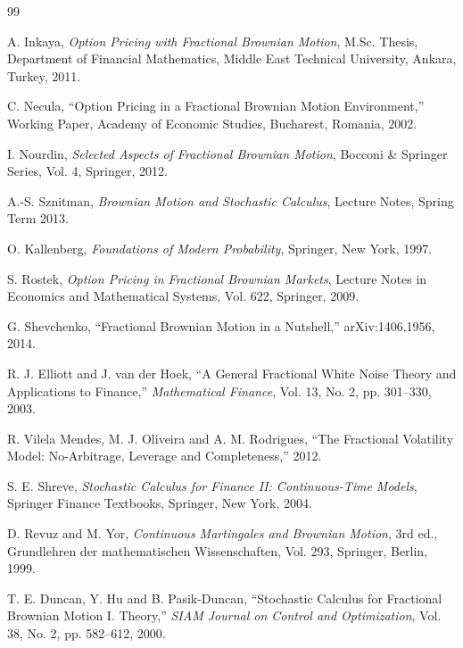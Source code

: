 \documentclass{article}
\begin{document}
\begin{thebibliography}{99}

A. Inkaya,
\textit{Option Pricing with Fractional Brownian Motion},
M.Sc. Thesis, Department of Financial Mathematics,
Middle East Technical University, Ankara, Turkey, 2011.

C. Necula,
``Option Pricing in a Fractional Brownian Motion Environment,''
Working Paper,
Academy of Economic Studies, Bucharest, Romania, 2002.

I. Nourdin,
\textit{Selected Aspects of Fractional Brownian Motion},
Bocconi \& Springer Series, Vol. 4,
Springer, 2012.

A.-S. Sznitman,
\textit{Brownian Motion and Stochastic Calculus},
Lecture Notes, Spring Term 2013.

O. Kallenberg,
\textit{Foundations of Modern Probability},
Springer, New York, 1997.

S. Rostek,
\textit{Option Pricing in Fractional Brownian Markets},
Lecture Notes in Economics and Mathematical Systems, Vol. 622,
Springer, 2009.

G. Shevchenko,
``Fractional Brownian Motion in a Nutshell,''
arXiv:1406.1956, 2014.

R. J. Elliott and J. van der Hoek,
``A General Fractional White Noise Theory and Applications to Finance,''
\textit{Mathematical Finance},
Vol. 13, No. 2, pp. 301--330, 2003.

R. Vilela Mendes, M. J. Oliveira and A. M. Rodrigues,
``The Fractional Volatility Model: No-Arbitrage, Leverage and Completeness,''
2012.

S. E. Shreve,
\textit{Stochastic Calculus for Finance II: Continuous-Time Models},
Springer Finance Textbooks,
Springer, New York, 2004.

D. Revuz and M. Yor,
\textit{Continuous Martingales and Brownian Motion},
3rd ed.,
Grundlehren der mathematischen Wissenschaften, Vol. 293,
Springer, Berlin, 1999.

T. E. Duncan, Y. Hu and B. Pasik-Duncan,
``Stochastic Calculus for Fractional Brownian Motion I. Theory,''
\textit{SIAM Journal on Control and Optimization},
Vol. 38, No. 2, pp. 582--612, 2000.

\end{thebibliography}
\end{document}
